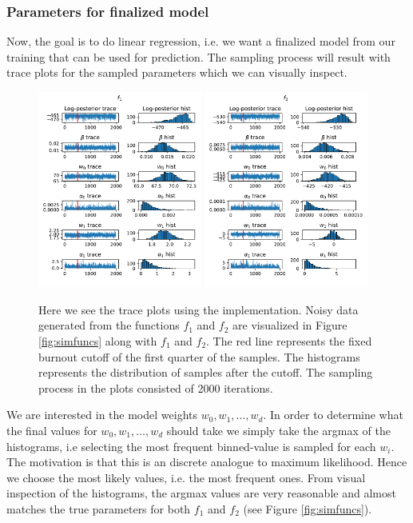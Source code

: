 \documentclass[12pt]{article}
\begin{document}
        \subsubsection{Parameters for finalized model} \label{seq:determine}
            Now, the goal is to do linear regression, i.e. we want a finalized model from our training that can be used for prediction. The sampling process will result with trace plots for the sampled parameters which we can visually inspect.  
            \begin{figure}[H]
                \centering
                \includegraphics[width=0.48\textwidth]{f_1_noise0_tplot_ard.pdf}
                \includegraphics[width=0.48\textwidth]{f_2_noise0_tplot_ard.pdf}
                \caption{Here we see the trace plots using the implementation. Noisy data generated from the functions $f_1$ and $f_2$ are visualized in Figure \ref{fig:simfuncs} along with $f_1$ and $f_2$. The red line represents the fixed burnout cutoff of the first quarter of the samples. The histograms represents the distribution of samples after the cutoff. The sampling process in the plots consisted of 2000 iterations.}
            \end{figure}
            We are interested in the model weights $w_0, w_1, \ldots, w_d$. In order to determine what the final values for $w_0, w_1, \ldots, w_d$ should take we simply take the argmax of the histograms, i.e selecting the most frequent binned-value is sampled for each $w_i$. The motivation is that this is an discrete analogue to maximum likelihood. Hence we choose the most likely values, i.e. the most frequent ones. From visual inspection of the histograms, the argmax values are very reasonable and almost matches the true parameters for both $f_1$ and $f_2$ (see Figure \ref{fig:simfuncs}).
\end{document}
